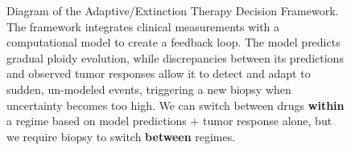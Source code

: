 \documentclass{article}
\begin{document}
\begin{figure}[h!]
{
}
\caption{Diagram of the Adaptive/Extinction Therapy Decision Framework. The framework integrates clinical measurements with a computational model to create a feedback loop. The model predicts gradual ploidy evolution, while discrepancies between its predictions and observed tumor responses allow it to detect and adapt to sudden, un-modeled events, triggering a new biopsy when uncertainty becomes too high. \color{blue} We can switch between drugs \textbf{within} a regime based on model predictions + tumor response alone, but we require biopsy to switch \textbf{between} regimes.}
\label{fig:framework_diagram}
\end{figure}
\end{document}
